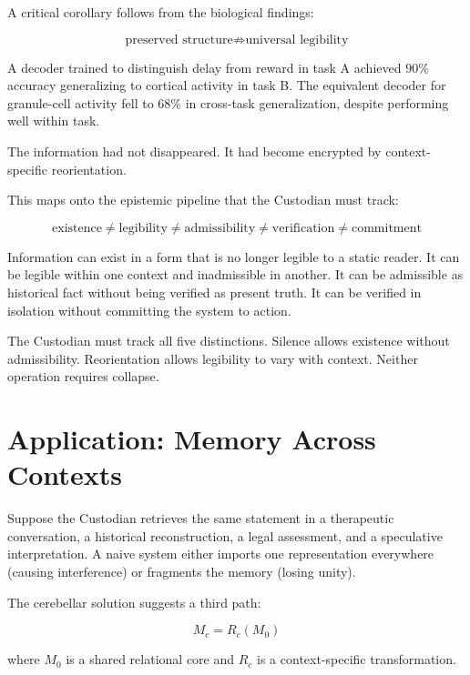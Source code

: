 \documentclass[12pt]{article}
\begin{document}
A critical corollary follows from the biological findings:

\begin{equation}
\boxed{\text{preserved structure} \not\Rightarrow \text{universal legibility}}
\end{equation}

A decoder trained to distinguish delay from reward in task A achieved $90\%$ accuracy generalizing to cortical activity in task B. The equivalent decoder for granule-cell activity fell to $68\%$ in cross-task generalization, despite performing well within task.

The information had not disappeared. It had become encrypted by context-specific reorientation.

This maps onto the epistemic pipeline that the Custodian must track:

\begin{equation}
\text{existence} \neq \text{legibility} \neq \text{admissibility} \neq \text{verification} \neq \text{commitment}
\end{equation}

Information can exist in a form that is no longer legible to a static reader. It can be legible within one context and inadmissible in another. It can be admissible as historical fact without being verified as present truth. It can be verified in isolation without committing the system to action.

The Custodian must track all five distinctions. Silence allows existence without admissibility. Reorientation allows legibility to vary with context. Neither operation requires collapse.

\section{Application: Memory Across Contexts}

Suppose the Custodian retrieves the same statement in a therapeutic conversation, a historical reconstruction, a legal assessment, and a speculative interpretation. A naive system either imports one representation everywhere (causing interference) or fragments the memory (losing unity).

The cerebellar solution suggests a third path:

\begin{equation}
M_c = R_c(M_0)
\end{equation}

where $M_0$ is a shared relational core and $R_c$ is a context-specific transformation.
\end{document}
